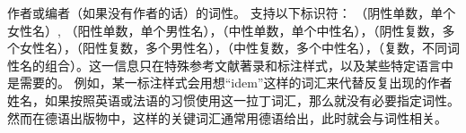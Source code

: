\begin{fieldlist}
作者或编者（如果没有作者的话）的词性。
支持以下标识符： （阴性单数，单个女性名）, （阳性单数，单个男性名），（中性单数，单个中性名），（阴性复数，多个女性名），（阳性复数，多个男性名），（中性复数，多个中性名），（复数，不同词性名的组合）。这一信息只在特殊参考文献著录和标注样式，以及某些特定语言中是需要的。
例如，某一标注样式会用想“idem”这样的词汇来代替反复出现的作者姓名，如果按照英语或法语的习惯使用这一拉丁词汇，那么就没有必要指定词性。然而在德语出版物中，这样的关键词汇通常用德语给出，此时就会与词性相关。


\end{fieldlist}
